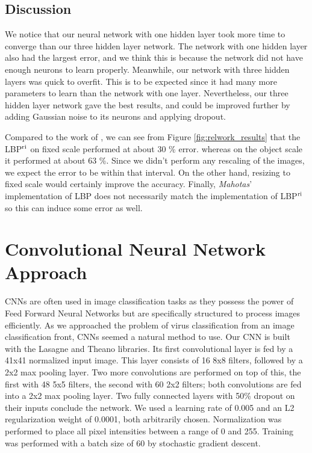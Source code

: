 \begin{multicols}{2}
\subsection{Discussion}
 We notice that our neural network with one hidden layer took more time to converge than our three hidden layer network. The network with one hidden layer also had the largest error, and we think this is because the network did not have enough neurons to learn properly. Meanwhile, our network with three hidden layers was quick to overfit. This is to be expected since it had many more parameters to learn than the network with one layer. Nevertheless, our three hidden layer network gave the best results, and could be improved further by adding Gaussian noise to its neurons and applying dropout. 
\par Compared to the work of \citet{kylberg2011virus}, we can see from Figure \ref{fig:relwork_results} that the LBP$^{\textnormal{ri}}$ on fixed scale performed at about 30 \% error. whereas on the object scale it performed at about 63 \%. Since we didn't perform any rescaling of the images, we expect the error to be within that interval. On the other hand, resizing to fixed scale would certainly improve the accuracy. Finally, \emph{Mahotas}' implementation of LBP does not necessarily match the implementation of LBP$^{\textnormal{ri}}$ so this can induce some error as well.

\section{Convolutional Neural Network Approach}
CNNs are often used in image classification tasks as they possess the power of Feed Forward Neural Networks but are specifically structured to process images efficiently. As we approached the problem of virus classification from an image classification front, CNNs seemed a natural method to use.
Our CNN is built with the Lasagne and Theano \citet{Bastien-Theano-2012, bergstra+al:2010-scipy} libraries. Its first convolutional layer is fed by a 41x41 normalized input image. This layer consists of 16 8x8 filters, followed by a 2x2 max pooling layer. Two more convolutions are performed on top of this, the first with 48 5x5 filters, the second with 60 2x2 filters; both convolutions are fed into a 2x2 max pooling layer. Two fully connected layers with 50\% dropout on their inputs conclude the network. We used a learning rate of 0.005 and an L2 regularization weight of 0.0001, both arbitrarily chosen. Normalization was performed to place all pixel intensities between a range of 0 and 255. Training was performed with a batch size of 60 by stochastic gradient descent.


\end{multicols}
